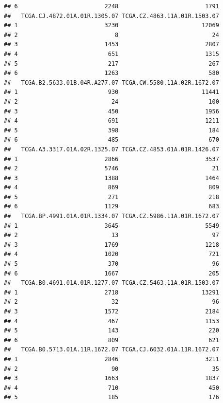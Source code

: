 \documentclass[
]{article}
\begin{document}
\begin{verbatim}
## 6                         2248                         1791
##   TCGA.CJ.4872.01A.01R.1305.07 TCGA.CZ.4863.11A.01R.1503.07
## 1                         3230                        12069
## 2                            8                           24
## 3                         1453                         2807
## 4                          651                         1315
## 5                          217                          267
## 6                         1263                          580
##   TCGA.B2.5633.01B.04R.A277.07 TCGA.CW.5580.11A.02R.1672.07
## 1                          930                        11441
## 2                           24                          100
## 3                          450                         1956
## 4                          691                         1211
## 5                          398                          184
## 6                          485                          670
##   TCGA.A3.3317.01A.02R.1325.07 TCGA.CZ.4853.01A.01R.1426.07
## 1                         2866                         3537
## 2                         5746                           21
## 3                         1388                         1464
## 4                          869                          809
## 5                          271                          218
## 6                         1129                          683
##   TCGA.BP.4991.01A.01R.1334.07 TCGA.CZ.5986.11A.01R.1672.07
## 1                         3645                         5549
## 2                           13                           97
## 3                         1769                         1218
## 4                         1020                          721
## 5                          370                           96
## 6                         1667                          205
##   TCGA.B0.4691.01A.01R.1277.07 TCGA.CZ.5463.11A.01R.1503.07
## 1                         2718                        13291
## 2                           32                           96
## 3                         1572                         2184
## 4                          467                         1153
## 5                          143                          220
## 6                          809                          621
##   TCGA.B0.5713.01A.11R.1672.07 TCGA.CJ.6032.01A.11R.1672.07
## 1                         2846                         3211
## 2                           90                           35
## 3                         1663                         1837
## 4                          710                          450
## 5                          185                          176

\end{verbatim}
\end{document}
